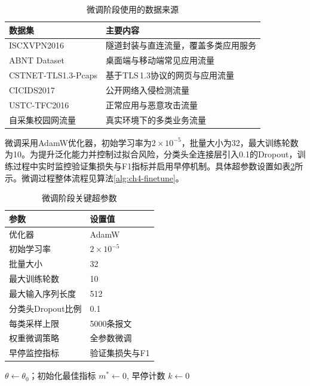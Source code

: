\begin{table}[h]
	\centering
	\caption{微调阶段使用的数据来源}\label{tab:ch4-finetune-dataset}
	\small
	\begin{tabular}{ll}
		\toprule
		数据集 & 主要内容 \\
		\midrule
		ISCXVPN2016 & 隧道封装与直连流量，覆盖多类应用服务 \\
		ABNT Dataset & 桌面端与移动端常见应用流量 \\
		CSTNET-TLS1.3-Pcaps & 基于TLS\,1.3协议的网页与应用流量 \\
		CICIDS2017 & 公开网络入侵检测流量 \\
		USTC-TFC2016 & 正常应用与恶意攻击流量 \\
		自采集校园网流量 & 真实环境下的多类业务流量 \\
		\bottomrule
	\end{tabular}
\end{table}

微调采用AdamW优化器，初始学习率为$2 \times 10^{-5}$，批量大小为32，最大训练轮数为10。为提升泛化能力并控制过拟合风险，分类头全连接层引入0.1的Dropout，训练过程中实时监控验证集损失与F1指标并启用早停机制。具体超参数设置如表\ref{tab:ch4-finetune-hparams}所示。微调过程整体流程见算法\ref{alg:ch4-finetune}。

\begin{table}[h]
	\centering
	\caption{微调阶段关键超参数}\label{tab:ch4-finetune-hparams}
	\small
	\begin{tabular}{ll}
		\toprule
		参数 & 设置值 \\
		\midrule
		优化器 & AdamW \\
		初始学习率 & $2 \times 10^{-5}$ \\
		批量大小 & 32 \\
		最大训练轮数 & 10 \\
		最大输入序列长度 & 512 \\
		分类头Dropout比例 & 0.1 \\
		每类采样上限 & 5000条报文 \\
		权重微调策略 & 全参数微调 \\
		早停监控指标 & 验证集损失与F1 \\
		\bottomrule
	\end{tabular}
\end{table}

\begin{algorithm}[h]
	\caption{流量分类模型微调流程}\label{alg:ch4-finetune}
	
	$\theta \gets \theta_0$；初始化最佳指标 $m^* \gets 0$, 早停计数 $k \gets 0$\;
	\Return{$\theta^*$}\;
\end{algorithm}


